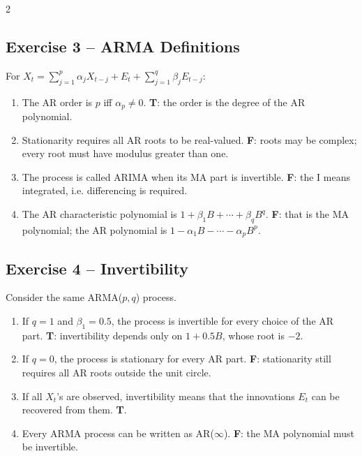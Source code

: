 \documentclass[9pt,a4paper]{extarticle}
\begin{document}
\begin{multicols}{2}
\subsection*{Exercise 3 -- ARMA Definitions}
For \(X_t=\sum_{j=1}^p\alpha_jX_{t-j}+E_t+\sum_{j=1}^q\beta_jE_{t-j}\):
\begin{enumerate}[label=\alph*),leftmargin=4mm]
\item The AR order is \(p\) iff \(\alpha_p\neq0\). \textbf{T}: the order is the degree of the AR polynomial.
\item Stationarity requires all AR roots to be real-valued. \textbf{F}: roots may be complex; every root must have modulus greater than one.
\item The process is called ARIMA when its MA part is invertible. \textbf{F}: the I means integrated, i.e. differencing is required.
\item The AR characteristic polynomial is \(1+\beta_1B+\cdots+\beta_qB^q\). \textbf{F}: that is the MA polynomial; the AR polynomial is \(1-\alpha_1B-\cdots-\alpha_pB^p\).
\end{enumerate}

\subsection*{Exercise 4 -- Invertibility}
Consider the same ARMA(\(p,q\)) process.
\begin{enumerate}[label=\alph*),leftmargin=4mm]
\item If \(q=1\) and \(\beta_1=0.5\), the process is invertible for every choice of the AR part. \textbf{T}: invertibility depends only on \(1+0.5B\), whose root is \(-2\).
\item If \(q=0\), the process is stationary for every AR part. \textbf{F}: stationarity still requires all AR roots outside the unit circle.
\item If all \(X_t\)'s are observed, invertibility means that the innovations \(E_t\) can be recovered from them. \textbf{T}.
\item Every ARMA process can be written as AR(\(\infty\)). \textbf{F}: the MA polynomial must be invertible.
\end{enumerate}


\end{multicols}
\end{document}
